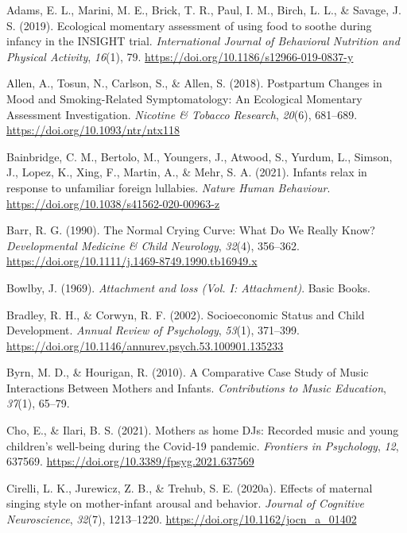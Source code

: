 \documentclass[
]{article}
\newlength{\cslhangindent}
\newenvironment{CSLReferences}[2] %
 {\begin{list}{}{%
  \setlength{\itemindent}{0pt}
  \setlength{\leftmargin}{0pt}
  \setlength{\parsep}{0pt}
  \ifodd #1
   \setlength{\leftmargin}{\cslhangindent}
   \setlength{\itemindent}{-1\cslhangindent}
  \fi
  \setlength{\itemsep}{#2\baselineskip}}}
 {\end{list}}
\begin{document}
\label{refs}
\begin{CSLReferences}{1}{0}
Adams, E. L., Marini, M. E., Brick, T. R., Paul, I. M., Birch, L. L., \&
Savage, J. S. (2019). Ecological momentary assessment of using food to
soothe during infancy in the {INSIGHT} trial. \emph{International
Journal of Behavioral Nutrition and Physical Activity}, \emph{16}(1),
79. \url{https://doi.org/10.1186/s12966-019-0837-y}

Allen, A., Tosun, N., Carlson, S., \& Allen, S. (2018). Postpartum
{Changes} in {Mood} and {Smoking-Related Symptomatology}: {An Ecological
Momentary Assessment Investigation}. \emph{Nicotine \& Tobacco
Research}, \emph{20}(6), 681--689.
\url{https://doi.org/10.1093/ntr/ntx118}

Bainbridge, C. M., Bertolo, M., Youngers, J., Atwood, S., Yurdum, L.,
Simson, J., Lopez, K., Xing, F., Martin, A., \& Mehr, S. A. (2021).
Infants relax in response to unfamiliar foreign lullabies. \emph{Nature
Human Behaviour}. \url{https://doi.org/10.1038/s41562-020-00963-z}

Barr, R. G. (1990). The {Normal Crying Curve}: {What Do We Really Know}?
\emph{Developmental Medicine \& Child Neurology}, \emph{32}(4),
356--362. \url{https://doi.org/10.1111/j.1469-8749.1990.tb16949.x}

Bowlby, J. (1969). \emph{Attachment and loss ({Vol}. {I}:
{Attachment})}. Basic Books.

Bradley, R. H., \& Corwyn, R. F. (2002). Socioeconomic {Status} and
{Child Development}. \emph{Annual Review of Psychology}, \emph{53}(1),
371--399. \url{https://doi.org/10.1146/annurev.psych.53.100901.135233}

Byrn, M. D., \& Hourigan, R. (2010). A {Comparative Case Study} of
{Music Interactions Between Mothers} and {Infants}. \emph{Contributions
to Music Education}, \emph{37}(1), 65--79.

Cho, E., \& Ilari, B. S. (2021). Mothers as home {DJs}: {Recorded} music
and young children's well-being during the {Covid-19} pandemic.
\emph{Frontiers in Psychology}, \emph{12}, 637569.
\url{https://doi.org/10.3389/fpsyg.2021.637569}

Cirelli, L. K., Jurewicz, Z. B., \& Trehub, S. E. (2020a). Effects of
maternal singing style on mother-infant arousal and behavior.
\emph{Journal of Cognitive Neuroscience}, \emph{32}(7), 1213--1220.
\url{https://doi.org/10.1162/jocn_a_01402}


\end{CSLReferences}
\end{document}
